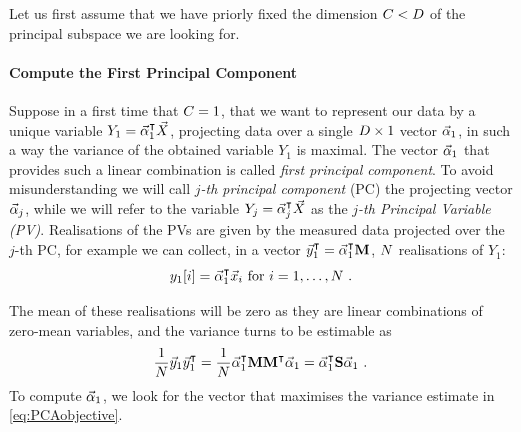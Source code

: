 Let us first assume that we have priorly fixed the dimension $C<D$ of the principal subspace we are looking for. 

\paragraph*{Compute the First Principal Component}
Suppose in a first time that $C = 1$, \ie that we want to represent our data by a unique variable $Y_1 =  \vec{\alpha}_1^\intercal \vec{X}{}$, \ie projecting data over a single $D\times 1$ vector $\vec{\alpha}_1$, in such a way the variance of the obtained variable $Y_1$ is maximal. The vector $\vec{\alpha}_1$ that provides such a linear combination is called {\em first principal component}. 
To avoid misunderstanding we will call {\em $j$-th principal component} (PC) the projecting vector $\vec{\alpha}_j$, while we will refer to the variable $Y_j = \vec{\alpha}_j^\intercal \vec{X}$ as the {\em $j$-th Principal Variable (PV)}. 
Realisations of the PVs are given by the measured data projected over the $j$-th PC, for example we can collect, in a vector $\vec{y}_1^\intercal = \vec{\alpha}_1^\intercal \textbf{M} $, $N $ realisations of $Y_1$:
\begin{equation}
y_1[i] = \vec{\alpha}_1^\intercal \vec{x}_i \mbox{ for } i=1,\dots , N \mbox{ .}
\end{equation}

The mean of these realisations will be zero as they are linear combinations of zero-mean variables, and the variance turns to be estimable as
\begin{equation}\label{eq:PCAobjective}
\frac{1}{N}\vec{y}_1\vec{y}_1^\intercal = \frac{1}{N}\vec{\alpha}_1^\intercal\textbf{M}\textbf{M}^\intercal\vec{\alpha}_1 = \vec{\alpha}_1^\intercal\textbf{S}\vec{\alpha}_1 \mbox{ .}
\end{equation}
To compute $\vec{\alpha}_1$, we look for the vector that maximises the variance estimate in \eqref{eq:PCAobjective}.\\

